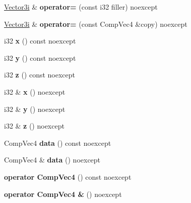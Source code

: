 \begin{DoxyCompactItemize}
\mbox{\hyperlink{class_vector3i}{Vector3i}} \& {\bfseries operator=} (const i32 filler) noexcept
\item 
\mbox{\label{class_vector3i_a11e3ae350fd9cde98aaa4211270e256a}} 
\mbox{\hyperlink{class_vector3i}{Vector3i}} \& {\bfseries operator=} (const Comp\+Vec4 \&copy) noexcept
\item 
\mbox{\label{class_vector3i_aca68aca497a4af8ff14802550f30319a}} 
i32 {\bfseries x} () const noexcept
\item 
\mbox{\label{class_vector3i_a93e430dd4b420c3c28b949e5e4cceed7}} 
i32 {\bfseries y} () const noexcept
\item 
\mbox{\label{class_vector3i_a91ee14a6766e398190212be4d607b972}} 
i32 {\bfseries z} () const noexcept
\item 
\mbox{\label{class_vector3i_a752a400a07b9509fa2c46a36de991a3c}} 
i32 \& {\bfseries x} () noexcept
\item 
\mbox{\label{class_vector3i_aab2aaae9767b14d93e3cdbd2593bdf51}} 
i32 \& {\bfseries y} () noexcept
\item 
\mbox{\label{class_vector3i_abcdcfc6e0684c8f525306c0c1a14b335}} 
i32 \& {\bfseries z} () noexcept
\item 
\mbox{\label{class_vector3i_a240396805e0dfc5c61d4c8e8dca08996}} 
Comp\+Vec4 {\bfseries data} () const noexcept
\item 
\mbox{\label{class_vector3i_ada0ea2ba17fd8e1aa7d62e49a9b4012a}} 
Comp\+Vec4 \& {\bfseries data} () noexcept
\item 
\mbox{\label{class_vector3i_a356455f5f301afdb0452da6e943e5266}} 
{\bfseries operator Comp\+Vec4} () const noexcept
\item 
\mbox{\label{class_vector3i_aa1f35bfbcb86fcc5535783575e02e842}} 
{\bfseries operator Comp\+Vec4 \&} () noexcept
\item 
\mbox{\label{class_vector3i_af1cafcf0b862b2bde89c4bfa1c6a4d87}} 

\end{DoxyCompactItemize}
